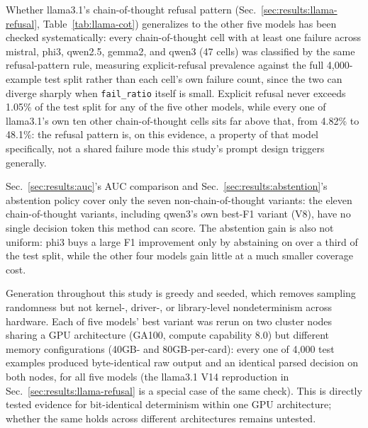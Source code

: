 Whether llama3.1's chain-of-thought refusal pattern
(Sec.~\ref{sec:results:llama-refusal}, Table~\ref{tab:llama-cot})
generalizes to the other five models has been checked systematically:
every chain-of-thought cell with at least one failure across mistral,
phi3, qwen2.5, gemma2, and qwen3 (47 cells) was classified by the same
refusal-pattern rule, measuring explicit-refusal prevalence against the
full 4{,}000-example test split rather than each cell's own failure
count, since the two can diverge sharply when \texttt{fail\_ratio}
itself is small. Explicit refusal never exceeds 1.05\% of the test split
for any of the five other models, while every one of llama3.1's own ten
other chain-of-thought cells sits far above that, from 4.82\% to
48.1\%: the refusal pattern is, on this evidence, a property of that
model specifically, not a shared failure mode this study's prompt
design triggers generally.

Sec.~\ref{sec:results:auc}'s AUC comparison and
Sec.~\ref{sec:results:abstention}'s abstention policy cover only the
seven non-chain-of-thought variants: the eleven chain-of-thought
variants, including qwen3's own best-F1 variant (V8), have no single
decision token this method can score. The abstention gain is also not
uniform: phi3 buys a large F1 improvement only by abstaining on over a
third of the test split, while the other four models gain little at a
much smaller coverage cost.

Generation throughout this study is greedy and seeded, which removes
sampling randomness but not kernel-, driver-, or library-level
nondeterminism across hardware. Each of five models' best variant was
rerun on two cluster nodes sharing a GPU architecture (GA100, compute
capability 8.0) but different memory configurations (40GB- and
80GB-per-card): every one of 4{,}000 test examples produced
byte-identical raw output and an identical parsed decision on both
nodes, for all five models (the llama3.1 V14 reproduction in
Sec.~\ref{sec:results:llama-refusal} is a special case of the same
check). This is directly tested evidence for bit-identical determinism
within one GPU architecture; whether the same holds across different
architectures remains untested.
